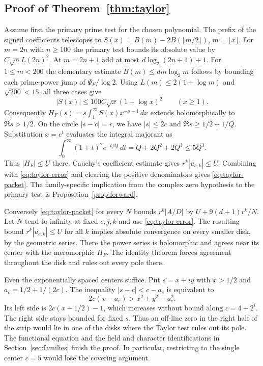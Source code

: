 \subsection*{Proof of Theorem~\ref{thm:taylor}}
Assume first the primary prime test for the chosen polynomial. The prefix of the signed coefficients telescopes to $S(x)=B(m)-2B(\lfloor m/2\rfloor)$, $m=\lfloor x\rfloor$. For $m=2n$ with $n\ge100$ the primary test bounds its absolute value by $C\sqrt n L(2n)^2$. At $m=2n+1$ add at most $d\log_2(2n+1)+1$. For $1\le m<200$ the elementary estimate $B(m)\le dm\log_2 m$ follows by bounding each prime-power jump of $\Psi_F/\log 2$. Using $L(m)\le2(1+\log m)$ and $\sqrt{200}<15$, all three cases give
\[
               |S(x)|\le 100 C\sqrt{x}(1+\log x)^2\qquad(x\ge1).
\]
Consequently $H_F(s)=s\int_1^\infty S(x)x^{-s-1}\,dx$ extends holomorphically to $\Re s>1/2$. On the circle $|s-c|=r$, we have $|s|\le2c$ and $\Re s\ge1/2+1/Q$. Substitution $x=e^t$ evaluates the integral majorant as
\[
   \int_0^\infty(1+t)^2e^{-t/Q}\,dt=Q+2Q^2+2Q^3\le5Q^3.
\]
Thus $|H_F|\le U$ there. Cauchy's coefficient estimate gives $r^k|u_{c,k}|\le U$. Combining with \eqref{eq:taylor-error} and clearing the positive denominators gives \eqref{eq:taylor-packet}. The family-specific implication from the complex zero hypothesis to the primary test is Proposition~\ref{prop:forward}.

Conversely \eqref{eq:taylor-packet} for every $N$ bounds $r^k|A/D|$ by $U+9(d+1)r^k/N$. Let $N$ tend to infinity at fixed $c,j,k$ and use \eqref{eq:taylor-error}. The resulting bound $r^k|u_{c,k}|\le U$ for all $k$ implies absolute convergence on every smaller disk, by the geometric series. There the power series is holomorphic and agrees near its center with the meromorphic $H_F$. The identity theorem forces agreement throughout the disk and rules out every pole there.

Even the exponentially spaced centers suffice. Put $s=x+iy$ with $x>1/2$ and $a_c=1/2+1/(2c)$. The inequality $|s-c|<c-a_c$ is equivalent to
\[
              2c(x-a_c)>x^2+y^2-a_c^2 .
\]
Its left side is $2c(x-1/2)-1$, which increases without bound along $c=4+2^i$. The right side stays bounded for fixed $s$. Thus an off-line zero in the right half of the strip would lie in one of the disks where the Taylor test rules out its pole. The functional equation and the field and character identifications in Section~\ref{sec:families} finish the proof. In particular, restricting to the single center $c=5$ would lose the covering argument.

